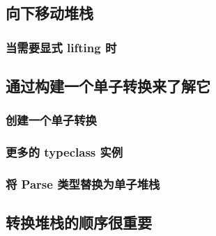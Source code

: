 \documentclass[./main.tex]{subfiles}
\begin{document}
\begin{lstlisting}[language=Haskell]

\end{lstlisting}



\begin{lstlisting}[language=Haskell]

\end{lstlisting}



\begin{lstlisting}[language=Haskell]

\end{lstlisting}



\begin{lstlisting}[language=Haskell]

\end{lstlisting}

\subsection*{向下移动堆栈}

\subsubsection*{当需要显式 lifting 时}

\subsection*{通过构建一个单子转换来了解它}

\subsubsection*{创建一个单子转换}
\subsubsection*{更多的 typeclass 实例}

\subsubsection*{将 Parse 类型替换为单子堆栈}

\subsection*{转换堆栈的顺序很重要}
\end{document}
